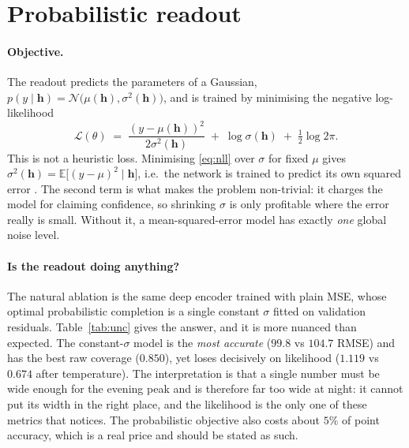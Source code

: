 \documentclass[11pt,a4paper]{article}
\newcommand{\hvec}{\mathbf{h}}
\newcommand{\given}{\mid}
\begin{document}
\section{Probabilistic readout}\label{sec:unc}

\paragraph{Objective.}
The readout predicts the parameters of a Gaussian, $p(y\given\hvec)=\mathcal{N}\big(\mu(\hvec),\sigma^2(\hvec)\big)$,
and is trained by minimising the negative log-likelihood
\begin{equation}
  \mathcal{L}(\theta) \;=\; \frac{(y-\mu(\hvec))^2}{2\sigma^2(\hvec)} \;+\; \log\sigma(\hvec) \;+\; \tfrac12\log 2\pi .
  \label{eq:nll}
\end{equation}
This is not a heuristic loss. Minimising \eqref{eq:nll} over $\sigma$ for fixed $\mu$ gives
$\sigma^2(\hvec)=\mathbb{E}\big[(y-\mu)^2\given\hvec\big]$, i.e.\ the network is trained to predict its
own squared error \cite{nix1994,bishop2006}. The second term is what makes the problem non-trivial: it
charges the model for claiming confidence, so shrinking $\sigma$ is only profitable where the error
really is small. Without it, a mean-squared-error model has exactly \emph{one} global noise level.

\paragraph{Is the readout doing anything?}
The natural ablation is the same deep encoder trained with plain MSE, whose optimal probabilistic
completion is a single constant $\sigma$ fitted on validation residuals. Table~\ref{tab:unc} gives the
answer, and it is more nuanced than expected. The constant-$\sigma$ model is the \emph{most accurate}
($99.8$ vs $104.7$ RMSE) and has the best raw coverage ($0.850$), yet loses decisively on likelihood
($1.119$ vs $0.674$ after temperature). The interpretation is that a single number must be wide enough
for the evening peak and is therefore far too wide at night: it cannot put its width in the right
place, and the likelihood is the only one of these metrics that notices. The probabilistic objective
also costs about $5\%$ of point accuracy, which is a real price and should be stated as such.
\end{document}
